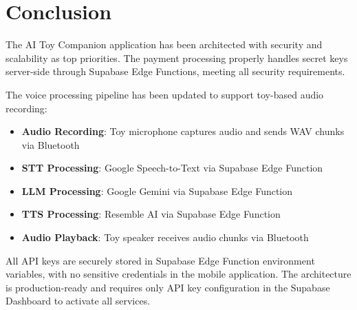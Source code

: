 \documentclass[11pt,a4paper]{article}
\begin{document}
\section{Conclusion}

The AI Toy Companion application has been architected with security and scalability as top priorities. The payment processing properly handles secret keys server-side through Supabase Edge Functions, meeting all security requirements.

The voice processing pipeline has been updated to support toy-based audio recording:
\begin{itemize}
    \item \textbf{Audio Recording}: Toy microphone captures audio and sends WAV chunks via Bluetooth
    \item \textbf{STT Processing}: Google Speech-to-Text via Supabase Edge Function
    \item \textbf{LLM Processing}: Google Gemini via Supabase Edge Function
    \item \textbf{TTS Processing}: Resemble AI via Supabase Edge Function
    \item \textbf{Audio Playback}: Toy speaker receives audio chunks via Bluetooth
\end{itemize}

All API keys are securely stored in Supabase Edge Function environment variables, with no sensitive credentials in the mobile application. The architecture is production-ready and requires only API key configuration in the Supabase Dashboard to activate all services.
\end{document}
